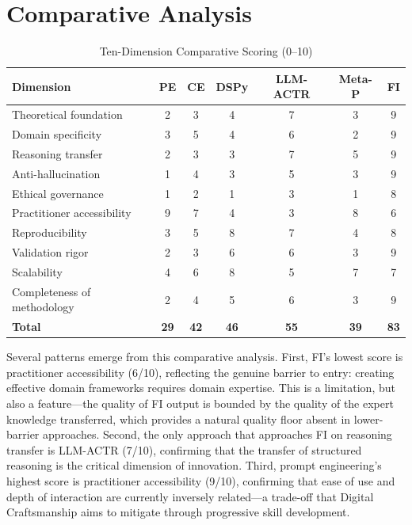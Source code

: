 \documentclass[12pt,a4paper]{article}
\begin{document}
\section{Comparative Analysis}
\label{sec:comparative}

\begin{table}[H]
\centering
\caption{Ten-Dimension Comparative Scoring (0--10)}
\label{tab:comparative}
\footnotesize
\begin{tabular}{@{}lcccccc@{}}
\toprule
\textbf{Dimension} & \textbf{PE} & \textbf{CE} & \textbf{DSPy} & \textbf{LLM-ACTR} & \textbf{Meta-P} & \textbf{FI} \\
\midrule
Theoretical foundation      & 2 & 3 & 4 & 7 & 3 & 9 \\
Domain specificity           & 3 & 5 & 4 & 6 & 2 & 9 \\
Reasoning transfer           & 2 & 3 & 3 & 7 & 5 & 9 \\
Anti-hallucination           & 1 & 4 & 3 & 5 & 3 & 9 \\
Ethical governance            & 1 & 2 & 1 & 3 & 1 & 8 \\
Practitioner accessibility   & 9 & 7 & 4 & 3 & 8 & 6 \\
Reproducibility              & 3 & 5 & 8 & 7 & 4 & 8 \\
Validation rigor             & 2 & 3 & 6 & 6 & 3 & 9 \\
Scalability                  & 4 & 6 & 8 & 5 & 7 & 7 \\
Completeness of methodology  & 2 & 4 & 5 & 6 & 3 & 9 \\
\midrule
\textbf{Total}               & \textbf{29} & \textbf{42} & \textbf{46} & \textbf{55} & \textbf{39} & \textbf{83} \\
\bottomrule
\end{tabular}
\end{table}

Several patterns emerge from this comparative analysis. First, FI's lowest score is practitioner accessibility (6/10), reflecting the genuine barrier to entry: creating effective domain frameworks requires domain expertise. This is a limitation, but also a feature---the quality of FI output is bounded by the quality of the expert knowledge transferred, which provides a natural quality floor absent in lower-barrier approaches. Second, the only approach that approaches FI on reasoning transfer is LLM-ACTR (7/10), confirming that the transfer of structured reasoning is the critical dimension of innovation. Third, prompt engineering's highest score is practitioner accessibility (9/10), confirming that ease of use and depth of interaction are currently inversely related---a trade-off that Digital Craftsmanship aims to mitigate through progressive skill development.
\end{document}
